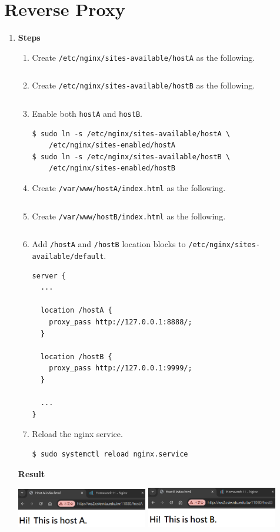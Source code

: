 \documentclass[12pt, a4paper]{article}
\begin{document}
  \section*{Reverse Proxy}
  \begin{enumerate}[resume]
    \item \textbf{Steps}
    \begin{enumerate}[label=(\arabic*)]
      \item Create \verb|/etc/nginx/sites-available/hostA| as the following.
      \inputminted{nginx}{server/etc/nginx/sites-available/hostA}
      \item Create \verb|/etc/nginx/sites-available/hostB| as the following.
      \inputminted{nginx}{server/etc/nginx/sites-available/hostB}
      \item Enable both \verb|hostA| and \verb|hostB|.
      \begin{Verbatim}[frame=single]
$ sudo ln -s /etc/nginx/sites-available/hostA \
    /etc/nginx/sites-enabled/hostA
$ sudo ln -s /etc/nginx/sites-available/hostB \
    /etc/nginx/sites-enabled/hostB
      \end{Verbatim}
      \item Create \verb|/var/www/hostA/index.html| as the following.
      \inputminted{html}{server/var/www/hostA/index.html}
      \item Create \verb|/var/www/hostB/index.html| as the following.
      \inputminted{html}{server/var/www/hostB/index.html}
      \item Add \verb|/hostA| and \verb|/hostB| location blocks to
      \verb|/etc/nginx/sites-available/default|.
      \begin{Verbatim}[frame=single]
server {
  ...

  location /hostA {
    proxy_pass http://127.0.0.1:8888/;
  }

  location /hostB {
    proxy_pass http://127.0.0.1:9999/;
  }

  ...
}
      \end{Verbatim}
      \item Reload the nginx service.
      \begin{Verbatim}[frame=single]
$ sudo systemctl reload nginx.service
      \end{Verbatim}
    \end{enumerate}

    \textbf{Result}

    \includegraphics[width=0.45\textwidth]{13_hostA.png}
    \includegraphics[width=0.45\textwidth]{13_hostB.png}


\end{enumerate}
\end{document}
